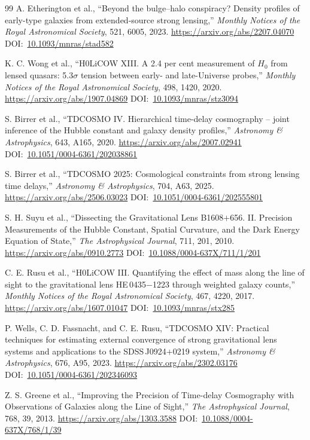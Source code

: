 \documentclass[10pt,onecolumn]{article}
\newcommand{\doi}[1]{DOI:~\href{https://doi.org/#1}{#1}}
\begin{document}
\begin{thebibliography}{99}
A. Etherington et al.,
``Beyond the bulge--halo conspiracy? Density profiles of early-type galaxies from extended-source strong lensing,''
\emph{Monthly Notices of the Royal Astronomical Society}, 521, 6005, 2023.
\url{https://arxiv.org/abs/2207.04070}
\doi{10.1093/mnras/stad582}

K. C. Wong et al.,
``H0LiCOW XIII. A 2.4 per cent measurement of $H_0$ from lensed quasars: 5.3$\sigma$ tension between early- and late-Universe probes,''
\emph{Monthly Notices of the Royal Astronomical Society}, 498, 1420, 2020.
\url{https://arxiv.org/abs/1907.04869}
\doi{10.1093/mnras/stz3094}

S. Birrer et al.,
``TDCOSMO IV. Hierarchical time-delay cosmography -- joint inference of the Hubble constant and galaxy density profiles,''
\emph{Astronomy \& Astrophysics}, 643, A165, 2020.
\url{https://arxiv.org/abs/2007.02941}
\doi{10.1051/0004-6361/202038861}

S. Birrer et al.,
``TDCOSMO 2025: Cosmological constraints from strong lensing time delays,''
\emph{Astronomy \& Astrophysics}, 704, A63, 2025.
\url{https://arxiv.org/abs/2506.03023}
\doi{10.1051/0004-6361/202555801}

S. H. Suyu et al.,
``Dissecting the Gravitational Lens B1608$+$656. II. Precision Measurements of the Hubble Constant, Spatial Curvature, and the Dark Energy Equation of State,''
\emph{The Astrophysical Journal}, 711, 201, 2010.
\url{https://arxiv.org/abs/0910.2773}
\doi{10.1088/0004-637X/711/1/201}

C. E. Rusu et al.,
``H0LiCOW III. Quantifying the effect of mass along the line of sight to the gravitational lens HE\,0435$-$1223 through weighted galaxy counts,''
\emph{Monthly Notices of the Royal Astronomical Society}, 467, 4220, 2017.
\url{https://arxiv.org/abs/1607.01047}
\doi{10.1093/mnras/stx285}

P. Wells, C. D. Fassnacht, and C. E. Rusu,
``TDCOSMO XIV: Practical techniques for estimating external convergence of strong gravitational lens systems and applications to the SDSS\,J0924$+$0219 system,''
\emph{Astronomy \& Astrophysics}, 676, A95, 2023.
\url{https://arxiv.org/abs/2302.03176}
\doi{10.1051/0004-6361/202346093}

Z. S. Greene et al.,
``Improving the Precision of Time-delay Cosmography with Observations of Galaxies along the Line of Sight,''
\emph{The Astrophysical Journal}, 768, 39, 2013.
\url{https://arxiv.org/abs/1303.3588}
\doi{10.1088/0004-637X/768/1/39}


\end{thebibliography}
\end{document}
